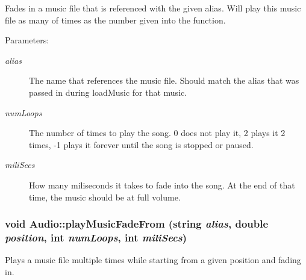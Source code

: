 Fades in a music file that is referenced with the given alias. Will play this music file as many of times as the number given into the function. \begin{Desc}
\item[Parameters:]
\begin{description}
\item[{\em alias}]The name that references the music file. Should match the alias that was passed in during loadMusic for that music. \item[{\em numLoops}]The number of times to play the song. 0 does not play it, 2 plays it 2 times, -1 plays it forever until the song is stopped or paused. \item[{\em miliSecs}]How many miliseconds it takes to fade into the song. At the end of that time, the music should be at full volume. \end{description}
\end{Desc}
\hypertarget{class_audio_0d60e2b77d91abc362f46dcf0a11325f}{
\subsubsection[{playMusicFadeFrom}]{\setlength{\rightskip}{0pt plus 5cm}void Audio::playMusicFadeFrom (string {\em alias}, \/  double {\em position}, \/  int {\em numLoops}, \/  int {\em miliSecs})}}
\label{class_audio_0d60e2b77d91abc362f46dcf0a11325f}


Plays a music file multiple times while starting from a given position and fading in. 

